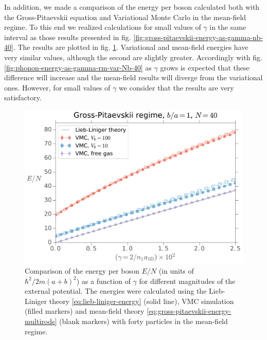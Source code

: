 In addition, we made a comparison of the energy per boson calculated both with
the Gross-Pitaevskii equation and Variational Monte Carlo in the mean-field
regime. To this end we realized calculations for small values of $\gamma$ in the
same interval as those results presented in fig.
\ref{fig:gross-pitaevskii-energy-as-gamma-nb-40}. The results are plotted in
fig. \ref{fig:phonon-gp-energy-as-gamma-rm-var-nb-40}. Variational and
mean-field energies have very similar values, although the second are slightly
greater. Accordingly with fig. \ref{fig:phonon-energy-as-gamma-rm-var-Nb-40} as
$\gamma$ grows is expected that these difference will increase and the
mean-field results will diverge from the variational ones. However, for small
values of $\gamma$ we consider that the results are very satisfactory.


\begin{figure}
	\centering
	\includegraphics[width=0.75\linewidth]{./figures/phonon-gp_energy-as-gamma_rm-var_Nb-40}
	\caption{ Comparison of the energy per boson $E/N$ (in units of $\hbar^2/2m(a
		+ b)^2$) as a function of $\gamma$ for different magnitudes of the external
		potential. The energies were calculated using the Lieb-Liniger theory
		\eqref{eq:lieb-liniger-energy} (solid line), VMC simulation (filled markers)
		and mean-field theory \eqref{eq:gross-pitaevskii-energy-multirods} (blank
		markers) with forty particles in the mean-field regime. }
	\label{fig:phonon-gp-energy-as-gamma-rm-var-nb-40}
\end{figure}

